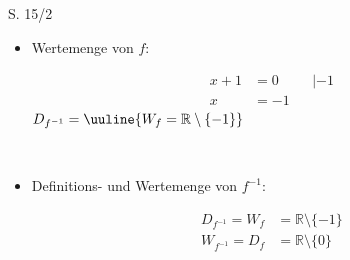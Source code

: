 \begin{Exercise}{S. 15/2}{}
\begin{enumerate}
\begin{enumerate}[label=\alph*)]
{\begin{minipage}[t]{0.8\linewidth}
\begin{itemize}[leftmargin=*]
\begin{minipage}[t]{0.8\linewidth}
                        \end{minipage}
                        \item Wertemenge von $f$: \qquad \begin{minipage}[t]{0.8\linewidth}
                            \begin{align*}
                                x + 1 & = 0 &&| -1\\[1.0ex]
                                x &= -1 &&
                            \end{align*}
                            $D_{f^{-1}} = \uuline{W_{f} = \mathbb{R} \setminus \{-1\}}$
                        \end{minipage}\\[1.0ex]
                        \item Definitions- und Wertemenge von $f^{-1}$:\\[-1.0ex]
                            \begin{minipage}[t]{0.8\linewidth}
                                \begin{align*}
                                    D_{f^{-1}} = W_{f} &= \mathbb{R} \setminus \{-1\}\\[1.0ex]
                                    W_{f^{-1}} = D_{f} &= \mathbb{R} \setminus \{0\}   
                                \end{align*}                             
                            \end{minipage}
                    \end{itemize}
                \end{minipage}
            }
        \end{enumerate}
\end{enumerate}
\end{Exercise}
